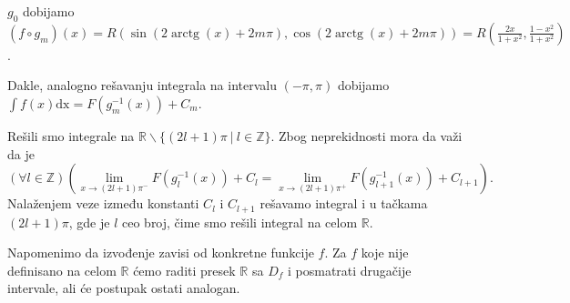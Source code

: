 \documentclass{article}
\DeclareMathOperator{\arctg}{arctg}
\begin{document}
$g_0$ dobijamo $(f\circ g_m)(x)=R(\sin(2\arctg(x)+2m\pi),\cos(2\arctg(x)+2m\pi))=R(\frac{2x}{1+x^2},\frac{1-x^2}{1+x^2})$.\par
Dakle, analogno rešavanju integrala na intervalu $(-\pi,\pi)$ dobijamo  $\int f(x)\text{dx}=F(g_m^{-1}(x))+C_m$.\par
Rešili smo integrale na $\mathbb{R}\backslash\{(2l+1)\pi\ |\ l\in\mathbb{Z}\}$. Zbog neprekidnosti mora da važi da
je $$(\forall l\in\mathbb{Z})(\lim_{x\to (2l+1)\pi^{-}}F(g_l^{-1}(x))+C_{l}=\lim_{x\to (2l+1)\pi^{+}}F(g_{l+1}^{-1}(x))+C_{l+1}).$$
Nalaženjem veze između konstanti $C_l$ i $C_{l+1}$ rešavamo integral i u tačkama $(2l+1)\pi$, gde je $l$ ceo broj, čime smo rešili integral
na celom $\mathbb{R}$.\par
Napomenimo da izvođenje zavisi od konkretne funkcije $f$. Za $f$ koje nije definisano na celom $\mathbb{R}$ ćemo raditi presek $\mathbb{R}$ sa $D_f$ i
posmatrati drugačije intervale, ali će postupak ostati analogan.
\end{document}
